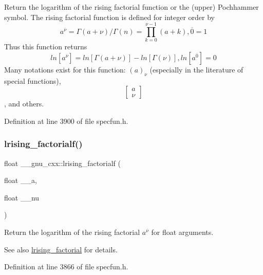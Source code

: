 Return the logarithm of the rising factorial function or the (upper) Pochhammer symbol. The rising factorial function is defined for integer order by \[ a^{\overline{\nu}} = \Gamma(a + \nu) / \Gamma(n) = \prod_{k=0}^{\nu-1} (a + k), \overline{0} = 1 \] Thus this function returns \[ ln[a^{\overline{\nu}}] = ln[\Gamma(a + \nu)] - ln[\Gamma(\nu)], ln[a^{\overline{0}}] = 0 \] Many notations exist for this function\+: $ (a)_\nu $ (especially in the literature of special functions), \[ \left[ \begin{array}{c} a \\ \nu \end{array} \right] \], and others. 



Definition at line 3900 of file specfun.\+h.

\mbox{\label{group__gnu__math__spec__func_ga68c64f4e44d03b5b3f75f90dbe2e0819}} 
\subsubsection{\texorpdfstring{lrising\+\_\+factorialf()}{lrising\_factorialf()}}
{\footnotesize\ttfamily float \+\_\+\+\_\+gnu\+\_\+cxx\+::lrising\+\_\+factorialf (\begin{DoxyParamCaption}\item[{float}]{\+\_\+\+\_\+a,  }\item[{float}]{\+\_\+\+\_\+nu }\end{DoxyParamCaption})\hspace{0.3cm}{\ttfamily [inline]}}

Return the logarithm of the rising factorial $ a^{\overline{\nu}} $ for float arguments.

\begin{DoxySeeAlso}{See also}
\hyperlink{group__gnu__math__spec__func_ga8912b75b2f7592fb61128c766e7313b9}{lrising\+\_\+factorial} for details. 
\end{DoxySeeAlso}


Definition at line 3866 of file specfun.\+h.

\mbox{\label{group__gnu__math__spec__func_ga1ac811f56f38f7ea7a1e035ec0157f6b}} 
